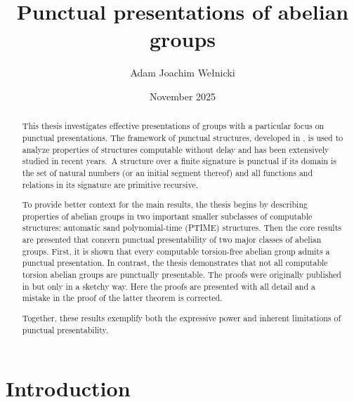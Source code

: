 \documentclass{pracalicmgr2025}
\author{Adam Joachim Wełnicki}
\title{Punctual presentations of abelian groups}
\date{}
\date{November 2025}
\theoremstyle{plain}            %
\theoremstyle{remark}           %
\theoremstyle{definition}       %
\begin{document}
\maketitle
\begin{abstract}
This thesis investigates effective presentations of groups with a particular focus on punctual presentations. The framework of punctual structures, developed in \cite{3}, is used to analyze properties of structures computable without delay and has been extensively studied in recent years.\ A structure over a finite signature is punctual if its domain is the set of natural numbers (or an initial segment thereof) and all functions and relations in its signature are primitive recursive.

To provide better context for the main results, the thesis begins by describing properties of abelian groups in two important smaller subclasses of computable structures: automatic sand polynomial-time (PTIME) structures. Then the core results are presented that concern punctual presentability of two major classes of abelian groups. First, it is shown that every computable torsion-free abelian group admits a punctual presentation. In contrast, the thesis demonstrates that not all computable torsion abelian groups are punctually presentable. The proofs were originally published in \cite{3} but only in a sketchy way. Here the proofs are presented with all detail and a mistake in the proof of the latter theorem is corrected.

Together, these results exemplify both the expressive power and inherent limitations of punctual presentability.  
\end{abstract}
\tableofcontents
\chapter{Introduction}
\end{document}

